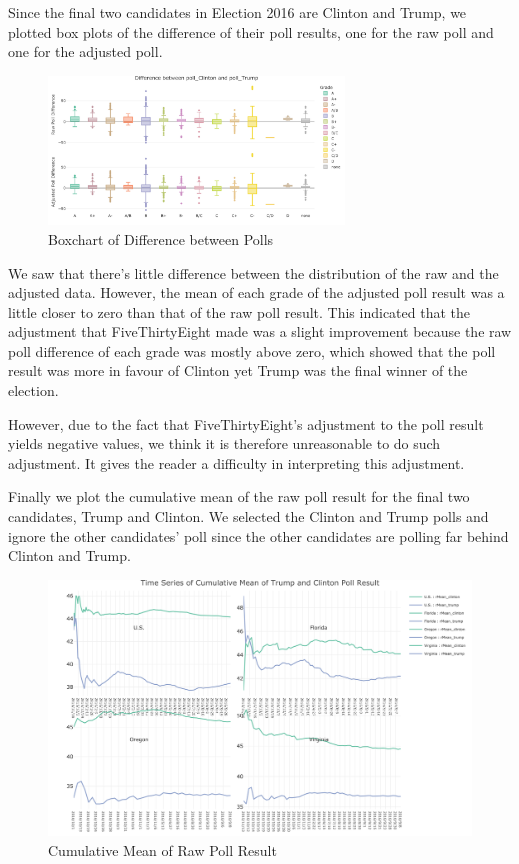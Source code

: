 \documentclass[
  12pt,
]{article}
\begin{document}
Since the final two candidates in Election 2016 are Clinton and Trump,
we plotted box plots of the difference of their poll results, one for
the raw poll and one for the adjusted poll.

\begin{figure}
\centering
\includegraphics[width=0.7\textwidth,height=\textheight]{./Figures/boxchart.png}
\caption{Boxchart of Difference between Polls}
\end{figure}

We saw that there's little difference between the distribution of the
raw and the adjusted data. However, the mean of each grade of the
adjusted poll result was a little closer to zero than that of the raw
poll result. This indicated that the adjustment that FiveThirtyEight
made was a slight improvement because the raw poll difference of each
grade was mostly above zero, which showed that the poll result was more
in favour of Clinton yet Trump was the final winner of the election.

However, due to the fact that FiveThirtyEight's adjustment to the poll
result yields negative values, we think it is therefore unreasonable to
do such adjustment. It gives the reader a difficulty in interpreting
this adjustment.

Finally we plot the cumulative mean of the raw poll result for the final
two candidates, Trump and Clinton. We selected the Clinton and Trump
polls and ignore the other candidates' poll since the other candidates
are polling far behind Clinton and Trump.

\begin{figure}
\centering
\includegraphics{./Figures/cMeanchart.png}
\caption{Cumulative Mean of Raw Poll Result}
\end{figure}
\end{document}
